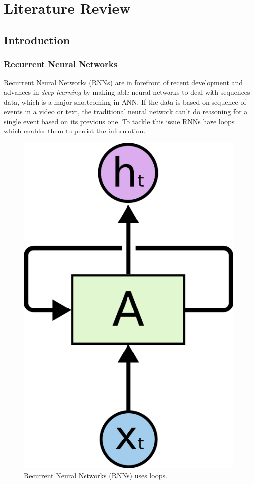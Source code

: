 \chapter{Literature Review}
\label{chap:lit.review}

\section{Introduction}

\subsection{Recurrent Neural Networks}

Recurrent Neural Networks (RNNs) are in forefront of recent development and advances in \textit{deep learning} by making able neural networks to deal with sequences data, which is a major shortcoming in ANN. If the data is based on sequence of events in a video or text, the traditional neural network can't do reasoning for a single event based on its previous one. To tackle this issue RNNs have loops which enables them to persist the information.

\begin{figure}[p]
	\centering
	\includegraphics[scale=0.4]{./figs/rnn-rolled}
	\caption[A Rolled Recurrent Neural Networks]{Recurrent Neural Networks (RNNs) uses loops.}
	\label{fig:rnn-rolled}
\end{figure}

